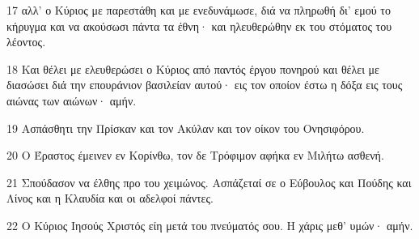 \par 17 αλλ' ο Κύριος με παρεστάθη και με ενεδυνάμωσε, διά να πληρωθή δι' εμού το κήρυγμα και να ακούσωσι πάντα τα έθνη· και ηλευθερώθην εκ του στόματος του λέοντος.
\par 18 Και θέλει με ελευθερώσει ο Κύριος από παντός έργου πονηρού και θέλει με διασώσει διά την επουράνιον βασιλείαν αυτού· εις τον οποίον έστω η δόξα εις τους αιώνας των αιώνων· αμήν.
\par 19 Ασπάσθητι την Πρίσκαν και τον Ακύλαν και τον οίκον του Ονησιφόρου.
\par 20 Ο Έραστος έμεινεν εν Κορίνθω, τον δε Τρόφιμον αφήκα εν Μιλήτω ασθενή.
\par 21 Σπούδασον να έλθης προ του χειμώνος. Ασπάζεταί σε ο Εύβουλος και Πούδης και Λίνος και η Κλαυδία και οι αδελφοί πάντες.
\par 22 Ο Κύριος Ιησούς Χριστός είη μετά του πνεύματός σου. Η χάρις μεθ' υμών· αμήν.


